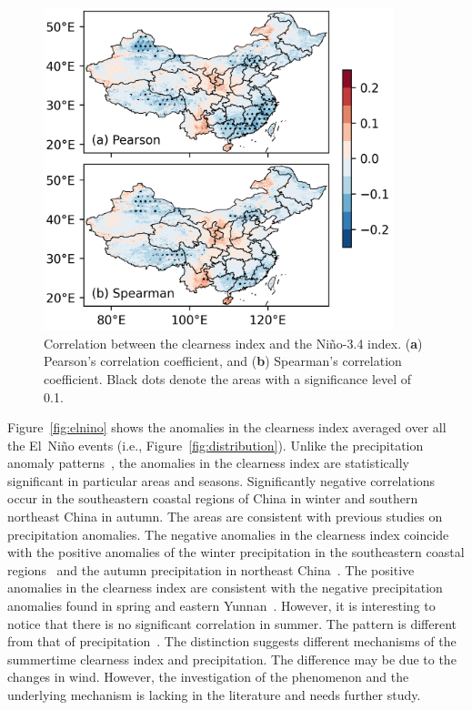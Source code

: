 \documentclass[atmosphere,article,accept,pdftex,moreauthors]{Definitions/mdpi}
\begin{document}
\begin{figure}[H]
  \includegraphics[width=10.16cm]{fig/correlation.png}
  \caption{Correlation between the clearness index and the Niño-3.4 index. (\textbf{a}) Pearson's correlation coefficient, and (\textbf{b}) Spearman's correlation coefficient. Black dots denote the areas with a significance level of 0.1. \label{fig:correlation}}
\end{figure}

Figure~\ref{fig:elnino} shows the anomalies in the clearness index averaged over all the El~Niño events (i.e., Figure~\ref{fig:distribution}). Unlike the precipitation anomaly patterns~\cite{huang1989AAS, zhang1999AAS, huang2012AAS}, the anomalies in the clearness index are statistically significant in particular areas and seasons. Significantly negative correlations occur in the southeastern coastal regions of China in winter and southern northeast China in autumn. The areas are consistent with previous studies on precipitation anomalies. The negative anomalies in the clearness index coincide with the positive anomalies of the winter precipitation in the southeastern coastal regions~\cite{wang2017IJC} and the autumn precipitation in northeast China~\cite{gu2022ACCR}. The positive anomalies in the clearness index are consistent with the negative precipitation anomalies found in spring and eastern Yunnan~\cite{li2021CDb}. However, it is interesting to notice that there is no significant correlation in summer. The pattern is different from that of precipitation~\cite{huang1989AAS, huang2012AAS, zhang1999AAS}. The distinction suggests different mechanisms of the summertime clearness index and precipitation. The difference may be due to the changes in wind. However, the investigation of the phenomenon and the underlying mechanism is lacking in the literature and needs further study.
\end{document}
